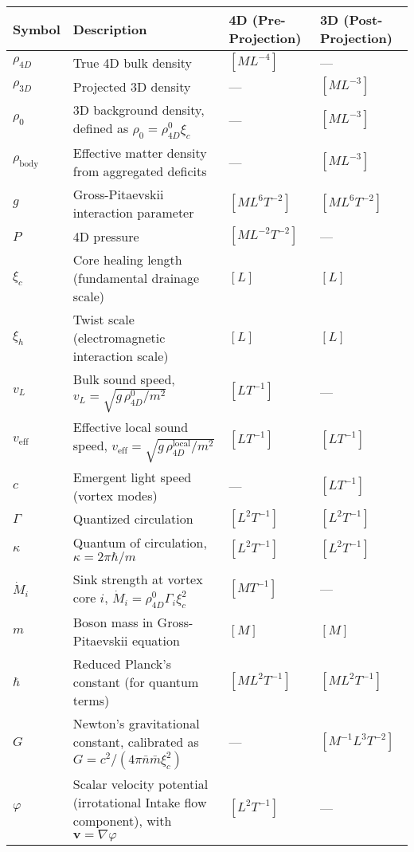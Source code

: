 \begin{table}[H]
\centering
\begingroup
\small
\begin{tabularx}{\textwidth}{|l|Y|l|l|}
\hline
Symbol & Description & 4D (Pre-Projection) & 3D (Post-Projection) \\
\hline
$\rho_{4D}$ & True 4D bulk density & $[M L^{-4}]$ & --- \\
\hline
$\rho_{3D}$ & Projected 3D density & --- & $[M L^{-3}]$ \\
\hline
$\rho_0$ & 3D background density, defined as $\rho_0 = \rho_{4D}^0 \xi_c$ & --- & $[M L^{-3}]$ \\
\hline
$\rho_{\text{body}}$ & Effective matter density from aggregated deficits & --- & $[M L^{-3}]$ \\
\hline
$g$ & Gross-Pitaevskii interaction parameter & $[M L^6 T^{-2}]$ & $[M L^6 T^{-2}]$ \\
\hline
$P$ & 4D pressure & $[M L^{-2} T^{-2}]$ & --- \\
\hline
$\xi_c$ & Core healing length (fundamental drainage scale) & $[L]$ & $[L]$ \\
\hline
$\xi_h$ & Twist scale (electromagnetic interaction scale) & $[L]$ & $[L]$ \\
\hline
$v_L$ & Bulk sound speed, $v_L = \sqrt{g \, \rho_{4D}^0 / m^{2}}$ & $[L T^{-1}]$ & --- \\
\hline
$v_{\text{eff}}$ & Effective local sound speed, $v_{\text{eff}} = \sqrt{g \, \rho_{4D}^{\text{local}} / m^{2}}$ & $[L T^{-1}]$ & $[L T^{-1}]$ \\
\hline
$c$ & Emergent light speed (vortex modes) & --- & $[L T^{-1}]$ \\
\hline
$\Gamma$ & Quantized circulation & $[L^2 T^{-1}]$ & $[L^2 T^{-1}]$ \\
\hline
$\kappa$ & Quantum of circulation, $\kappa = 2 \pi \hbar / m$ & $[L^2 T^{-1}]$ & $[L^2 T^{-1}]$ \\
\hline
$\dot{M}_i$ & Sink strength at vortex core $i$, $\dot{M}_i = \rho_{4D}^0 \Gamma_i \xi_c^2$ & $[M T^{-1}]$ & --- \\
\hline
$m$ & Boson mass in Gross-Pitaevskii equation & $[M]$ & $[M]$ \\
\hline
$\hbar$ & Reduced Planck's constant (for quantum terms) & $[M L^2 T^{-1}]$ & $[M L^2 T^{-1}]$ \\
\hline
$G$ & Newton's gravitational constant, calibrated as $G = c^2 / (4\pi \bar{n} \bar{m} \xi_c^2)$ & --- & $[M^{-1} L^3 T^{-2}]$ \\
\hline
$\varphi$ & Scalar velocity potential (irrotational Intake flow component), with $\mathbf v=\nabla\varphi$ & $[L^2 T^{-1}]$ & --- \\

\end{tabularx}
\end{table}
